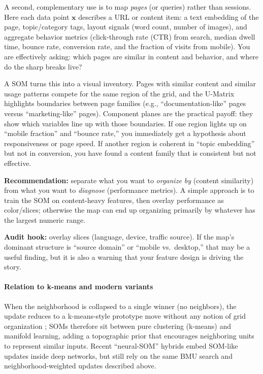 \begin{tcolorbox}[summarybox, title={Application example: mapping page archetypes and performance drivers}]
A second, complementary use is to map \emph{pages} (or queries) rather than sessions. Here each data point \(\mathbf{x}\) describes a URL or content item: a text embedding of the page, topic/category tags, layout signals (word count, number of images), and aggregate behavior metrics (click-through rate (CTR) from search, median dwell time, bounce rate, conversion rate, and the fraction of visits from mobile). You are effectively asking: which pages are similar in content and behavior, and where do the sharp breaks live?

A SOM turns this into a visual inventory. Pages with similar content and similar usage patterns compete for the same region of the grid, and the U-Matrix highlights boundaries between page families (e.g., ``documentation-like'' pages versus ``marketing-like'' pages). Component planes are the practical payoff: they show which variables line up with those boundaries. If one region lights up on ``mobile fraction'' and ``bounce rate,'' you immediately get a hypothesis about responsiveness or page speed. If another region is coherent in ``topic embedding'' but not in conversion, you have found a content family that is consistent but not effective.

\textbf{Recommendation:} separate what you want to \emph{organize by} (content similarity) from what you want to \emph{diagnose} (performance metrics). A simple approach is to train the SOM on content-heavy features, then overlay performance as color/slices; otherwise the map can end up organizing primarily by whatever has the largest numeric range.

\textbf{Audit hook:} overlay slices (language, device, traffic source). If the map's dominant structure is ``source domain'' or ``mobile vs.\ desktop,'' that may be a useful finding, but it is also a warning that your feature design is driving the story.
\end{tcolorbox}

\paragraph{Relation to k-means and modern variants}

When the neighborhood is collapsed to a single winner (no neighbors), the update reduces to a k-means-style prototype move without any notion of grid organization \citep{MacQueen1967}; SOMs therefore sit between pure clustering (k-means) and manifold learning, adding a topographic prior that encourages neighboring units to represent similar inputs. Recent ``neural-SOM'' hybrids embed SOM-like updates inside deep networks, but still rely on the same BMU search and neighborhood-weighted updates described above.

